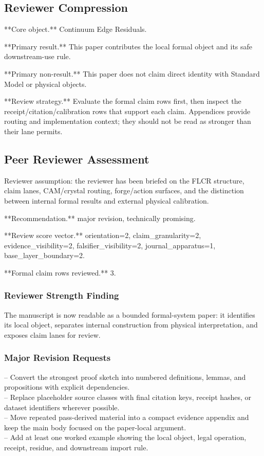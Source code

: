 \documentclass[11pt]{article}
\begin{document}
\subsection*{Reviewer Compression}

**Core object.** Continuum Edge Residuals.

**Primary result.** This paper contributes the local formal object and its safe downstream-use rule.

**Primary non-result.** This paper does not claim direct identity with Standard Model or physical objects.

**Review strategy.** Evaluate the formal claim rows first, then inspect the receipt/citation/calibration rows that support each claim. Appendices provide routing and implementation context; they should not be read as stronger than their lane permits.

\subsection*{Peer Reviewer Assessment}

Reviewer assumption: the reviewer has been briefed on the FLCR structure, claim lanes, CAM/crystal routing, forge/action surfaces, and the distinction between internal formal results and external physical calibration.

**Recommendation.** major revision, technically promising.

**Review score vector.** orientation=2, claim\_granularity=2, evidence\_visibility=2, falsifier\_visibility=2, journal\_apparatus=1, base\_layer\_boundary=2.

**Formal claim rows reviewed.** 3.

\subsubsection*{Reviewer Strength Finding}

The manuscript is now readable as a bounded formal-system paper: it identifies its local object, separates internal construction from physical interpretation, and exposes claim lanes for review.

\subsubsection*{Major Revision Requests}

\noindent{}-- Convert the strongest proof sketch into numbered definitions, lemmas, and propositions with explicit dependencies.\\
\noindent{}-- Replace placeholder source classes with final citation keys, receipt hashes, or dataset identifiers wherever possible.\\
\noindent{}-- Move repeated pass-derived material into a compact evidence appendix and keep the main body focused on the paper-local argument.\\
\noindent{}-- Add at least one worked example showing the local object, legal operation, receipt, residue, and downstream import rule.\\
\end{document}
